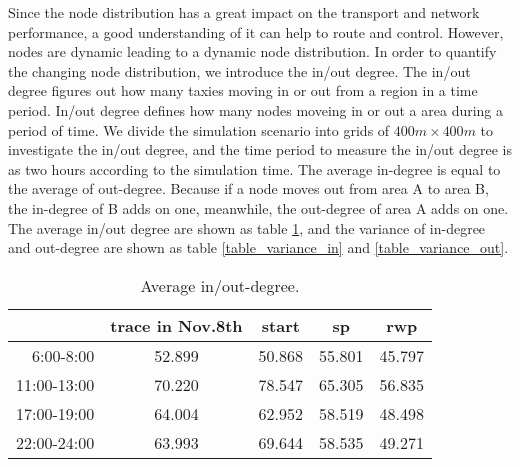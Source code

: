 Since the node distribution has a great impact on the transport and network performance, a good understanding of it can help to route and control.  However, nodes are dynamic leading to a dynamic node distribution. In order to quantify the changing node distribution,  we introduce the in/out degree. The in/out degree figures out how many taxies moving in or out from a region in a time period. In/out degree defines how many nodes moveing in or out a area during a period of time. 
We divide the simulation scenario into grids of $ 400m \times 400 m$ to investigate the in/out degree, and the time period to measure the in/out degree is as two hours according to the simulation time. 
The average in-degree is equal to the average of out-degree. Because if a node moves out from area A to area B, the in-degree of B adds on one, meanwhile, the out-degree of area A adds on one. The average in/out degree are shown as table \ref{table_avg_inoutdegree}, and the variance of in-degree and out-degree are shown as table \ref{table_variance_in} and \ref{table_variance_out}.
\begin{table}[!h]
\caption{Average in/out-degree.}\label{table_avg_inoutdegree}
\centering
\begin{tabular}{r|c|c|c|c}
\hline
	&trace in Nov.8th	&start	&sp	&rwp	\\
\hline
6:00-8:00&
52.899&50.868&55.801&45.797\\
\hline
11:00-13:00&
70.220&78.547&65.305&56.835\\  
\hline
17:00-19:00&
64.004&62.952&58.519&	48.498\\
\hline
22:00-24:00&
63.993&69.644&	58.535&	49.271\\	
\hline
\end{tabular}
\end{table}

